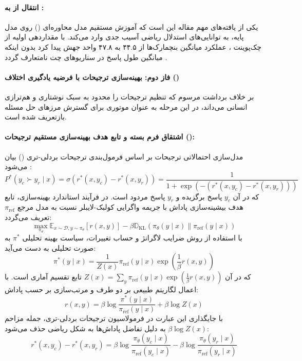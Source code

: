 \paragraph*{انتقال از  به :}
یکی از یافته‌های مهم مقاله  این است که آموزش مستقیم مدل محاوره‌ای () روی مدل پایه، به توانایی‌های استدلال ریاضی آسیب جدی وارد می‌کند. با مقداردهی اولیه  از چک‌پوینت ، عملکرد میانگین بنچمارک‌ها از ۴۴.۵ به ۴۷.۸ واحد جهش پیدا کرد بدون اینکه میانگین طول پاسخ در سناریوهای چت نامتعارف گردد \cite{olmo3}.

\paragraph*{فاز دوم: بهینه‌سازی ترجیحات با فرضیه یادگیری اختلاف ()}
بر خلاف برداشت مرسوم که تنظیم ترجیحات را محدود به سبک نوشتاری و هم‌ترازی انسانی می‌داند، در  این مرحله به عنوان موتوری برای گسترش مرزهای حل مسئله بازتعریف شده است.

\paragraph*{اشتقاق فرم بسته و تابع هدف بهینه‌سازی مستقیم ترجیحات ():}
مدل‌سازی احتمالاتی ترجیحات بر اساس فرمول‌بندی ترجیحات بردلی-تری () بیان می‌شود \cite{rafailov2024direct}:
\begin{equation}
    P^*(y_c \succ y_r \mid x) = \sigma(r^*(x, y_c) - r^*(x, y_r)) = \frac{1}{1 + \exp\left( -(r^*(x, y_c) - r^*(x, y_r)) \right)}
\end{equation}
که در آن $y_c$ پاسخ برگزیده و $y_r$ پاسخ مردود است. در فرآیند استاندارد بهینه‌سازی، تابع هدف بیشینه‌سازی پاداش با جریمه واگرایی کولبک-لایبلر نسبت به مدل مرجع $\pi_{\text{ref}}$ تعریف می‌گردد:
\begin{equation}
    \max_{\pi_\theta} \mathbb{E}_{x \sim \mathcal{D}, y \sim \pi_\theta} \left[ r(x, y) \right] - \beta \mathbb{D}_{\text{KL}}\left( \pi_\theta(y \mid x) \parallel \pi_{\text{ref}}(y \mid x) \right)
\end{equation}
با استفاده از روش ضرایب لاگرانژ و حساب تغییرات، سیاست بهینه تحلیلی $\pi^*$ به صورت تحلیلی به دست می‌آید:
\begin{equation}
    \pi^*(y \mid x) = \frac{1}{Z(x)} \pi_{\text{ref}}(y \mid x) \exp\left( \frac{1}{\beta} r(x, y) \right)
\end{equation}
که در آن $Z(x) = \sum_y \pi_{\text{ref}}(y \mid x) \exp\left(\frac{1}{\beta} r(x,y)\right)$ تابع تقسیم آماری است. با اعمال لگاریتم طبیعی بر دو طرف و مرتب‌سازی بر حسب پاداش:
\begin{equation}
    r(x, y) = \beta \log \frac{\pi^*(y \mid x)}{\pi_{\text{ref}}(y \mid x)} + \beta \log Z(x)
\end{equation}
با جایگذاری این عبارت در فرمولاسیون ترجیحات بردلی-تری، جمله مزاحم $\beta \log Z(x)$ به دلیل تفاضل پاداش‌ها به شکل ریاضی حذف می‌شود:
\begin{equation}
    r^*(x, y_c) - r^*(x, y_r) = \beta \log \frac{\pi_\theta(y_c \mid x)}{\pi_{\text{ref}}(y_c \mid x)} - \beta \log \frac{\pi_\theta(y_r \mid x)}{\pi_{\text{ref}}(y_r \mid x)}
\end{equation}

